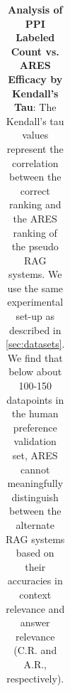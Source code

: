 \begin{table}[htp!]
\begin{tabular}{crrrrrr}
\end{tabular}
\caption{\textbf{Analysis of PPI Labeled Count vs. ARES Efficacy by Kendall's Tau}: The Kendall's tau values represent the correlation between the correct ranking and the ARES ranking of the pseudo RAG systems. We use the same experimental set-up as described in \autoref{sec:datasets}. We find that below about 100-150 datapoints in the human preference validation set, ARES cannot meaningfully distinguish between the alternate RAG systems based on their accuracies in context relevance and answer relevance (C.R. and A.R., respectively).}
\label{tab:ppi_count}
\end{table}
